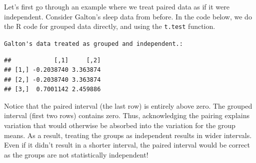 \documentclass[]{article}
\newenvironment{Shaded}{\begin{snugshade}}{\end{snugshade}}
\newcommand{\KeywordTok}[1]{\textcolor[rgb]{0.13,0.29,0.53}{\textbf{{#1}}}}
\newcommand{\DataTypeTok}[1]{\textcolor[rgb]{0.13,0.29,0.53}{{#1}}}
\newcommand{\DecValTok}[1]{\textcolor[rgb]{0.00,0.00,0.81}{{#1}}}
\newcommand{\StringTok}[1]{\textcolor[rgb]{0.31,0.60,0.02}{{#1}}}
\newcommand{\OtherTok}[1]{\textcolor[rgb]{0.56,0.35,0.01}{{#1}}}
\newcommand{\NormalTok}[1]{{#1}}
\begin{document}
Let's first go through an example where we treat paired data as if it
were independent. Consider Galton's sleep data from before. In the code
below, we do the R code for grouped data directly, and using the
\texttt{t.test} function.

\vspace{1pc}

\verb;Galton's data treated as grouped and independent.:;

\begin{Shaded}
\end{Shaded}

\begin{verbatim}
##            [,1]     [,2]
## [1,] -0.2038740 3.363874
## [2,] -0.2038740 3.363874
## [3,]  0.7001142 2.459886
\end{verbatim}

Notice that the paired interval (the last row) is entirely above zero.
The grouped interval (first two rows) contains zero. Thus, acknowledging
the pairing explains variation that would otherwise be absorbed into the
variation for the group means. As a result, treating the groups as
independent results in wider intervals. Even if it didn't result in a
shorter interval, the paired interval would be correct as the groups are
not statistically independent!
\end{document}
